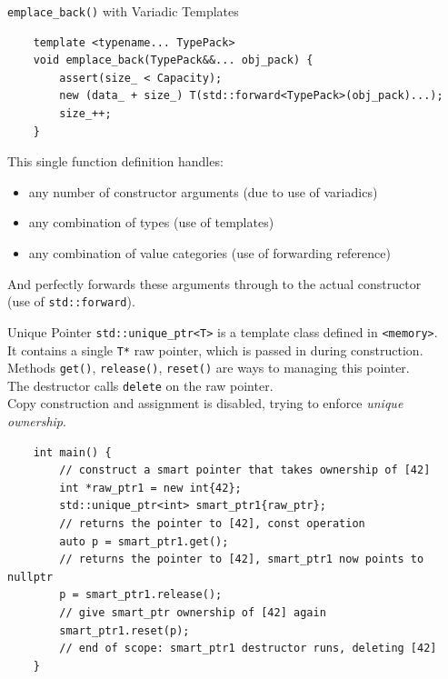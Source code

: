 \begin{frame}[fragile]{\texttt{emplace\_back()} with Variadic Templates}
  \begin{verbatim}
    template <typename... TypePack>
    void emplace_back(TypePack&&... obj_pack) {
        assert(size_ < Capacity);
        new (data_ + size_) T(std::forward<TypePack>(obj_pack)...);
        size_++;
    }
  \end{verbatim}

  This single function definition handles:
  \begin{itemize}
    \item any number of constructor arguments (due to use of variadics)
    \item any combination of types (use of templates)
    \item any combination of value categories (use of forwarding reference)
  \end{itemize}
  And perfectly forwards these arguments through to the actual constructor\\ 
  (use of \texttt{std::forward}).
\end{frame}

\begin{frame}[fragile]{Unique Pointer}
  \verb|std::unique_ptr<T>| is a template class defined in \texttt{<memory>}.\\
  It contains a single \texttt{T*} raw pointer, which is passed in during construction.\\
  Methods \texttt{get()}, \texttt{release()}, \texttt{reset()} are ways to managing this pointer.\\
  The destructor calls \texttt{delete} on the raw pointer.\\
  Copy construction and assignment is disabled, trying to enforce \emph{unique ownership}.
  
  \begin{verbatim}
    int main() {
        // construct a smart pointer that takes ownership of [42]
        int *raw_ptr1 = new int{42}; 
        std::unique_ptr<int> smart_ptr1{raw_ptr};
        // returns the pointer to [42], const operation
        auto p = smart_ptr1.get();
        // returns the pointer to [42], smart_ptr1 now points to nullptr
        p = smart_ptr1.release();
        // give smart_ptr ownership of [42] again
        smart_ptr1.reset(p);
        // end of scope: smart_ptr1 destructor runs, deleting [42]
    }
  \end{verbatim}
\end{frame}

